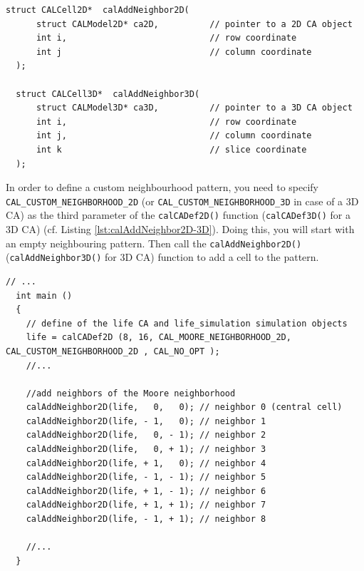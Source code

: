 \begin{lstlisting}[float,floatplacement=H, label=lst:calAddNeighbor2D-3D, caption=The calAddNeighbor2D() and calAddNeighbor3D() functions to define custom neighbourhood patterns., numbers=none]
  struct CALCell2D*  calAddNeighbor2D(
      struct CALModel2D* ca2D,          // pointer to a 2D CA object
      int i,                            // row coordinate
      int j                             // column coordinate
  );

  struct CALCell3D*  calAddNeighbor3D(
      struct CALModel3D* ca3D,          // pointer to a 3D CA object
      int i,                            // row coordinate
      int j,                            // column coordinate
      int k                             // slice coordinate
  );
\end{lstlisting}


In order to define a custom neighbourhood pattern, you need to specify
\verb'CAL_CUSTOM_NEIGHBORHOOD_2D' (or
\verb'CAL_CUSTOM_NEIGHBORHOOD_3D' in case of a 3D CA) as the third
parameter of the \verb'calCADef2D()' function (\verb'calCADef3D()' for
a 3D CA) (cf. Listing \ref{lst:calAddNeighbor2D-3D}). Doing this, you
will start with an empty neighbouring pattern. Then call the
\verb'calAddNeighbor2D()' (\verb'calAddNeighbor3D()' for 3D CA)
function to add a cell to the pattern.

\begin{lstlisting}[float,floatplacement=H, label=lst:CustomMooreExample, caption=Example of custom neighbourhood pattern; the sequence of calls to the calAddNeighbor2D() function defines the Moore neighbourhood for the Game of Life CA., numbers=none]
  // ...
  int main ()
  {
    // define of the life CA and life_simulation simulation objects
    life = calCADef2D (8, 16, CAL_MOORE_NEIGHBORHOOD_2D, CAL_CUSTOM_NEIGHBORHOOD_2D , CAL_NO_OPT );
    //...
    
    //add neighbors of the Moore neighborhood
    calAddNeighbor2D(life,   0,   0); // neighbor 0 (central cell)
    calAddNeighbor2D(life, - 1,   0); // neighbor 1
    calAddNeighbor2D(life,   0, - 1); // neighbor 2
    calAddNeighbor2D(life,   0, + 1); // neighbor 3
    calAddNeighbor2D(life, + 1,   0); // neighbor 4
    calAddNeighbor2D(life, - 1, - 1); // neighbor 5
    calAddNeighbor2D(life, + 1, - 1); // neighbor 6
    calAddNeighbor2D(life, + 1, + 1); // neighbor 7
    calAddNeighbor2D(life, - 1, + 1); // neighbor 8

    //...
  }
\end{lstlisting}

